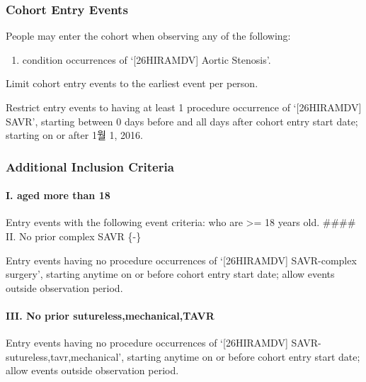 \documentclass[
  12pt,
]{article}
\providecommand{\tightlist}{%
  \setlength{\itemsep}{0pt}\setlength{\parskip}{0pt}}
\begin{document}
\subsubsection{Cohort Entry Events}\label{cohort-entry-events-1}

People may enter the cohort when observing any of the following:

\begin{enumerate}
\def\labelenumi{\arabic{enumi}.}
\tightlist
\item
  condition occurrences of `{[}26HIRAMDV{]} Aortic Stenosis'.
\end{enumerate}

Limit cohort entry events to the earliest event per person.

Restrict entry events to having at least 1 procedure occurrence of
`{[}26HIRAMDV{]} SAVR', starting between 0 days before and all days
after cohort entry start date; starting on or after 1월 1, 2016.

\subsubsection{Additional Inclusion
Criteria}\label{additional-inclusion-criteria-1}

\paragraph*{I. aged more than 18}\label{i.-aged-more-than-18}

Entry events with the following event criteria: who are \textgreater= 18
years old. \#\#\#\# II. No prior complex SAVR \{-\}

Entry events having no procedure occurrences of `{[}26HIRAMDV{]}
SAVR-complex surgery', starting anytime on or before cohort entry start
date; allow events outside observation period.

\paragraph*{III. No prior
sutureless,mechanical,TAVR}\label{iii.-no-prior-suturelessmechanicaltavr}

Entry events having no procedure occurrences of `{[}26HIRAMDV{]}
SAVR-sutureless,tavr,mechanical', starting anytime on or before cohort
entry start date; allow events outside observation period.
\end{document}
